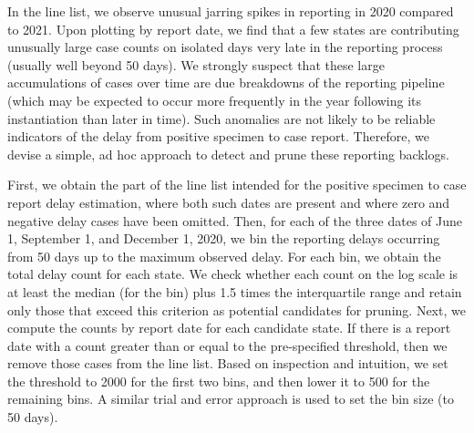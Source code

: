 \documentclass{article}
\begin{document}
In the line list, we observe unusual jarring spikes in reporting in 2020
compared to 2021. Upon plotting by report date, we find that a few states are
contributing unusually large case counts on isolated days very late in the
reporting process (usually well beyond 50 days). We strongly suspect that these
large accumulations of cases over time are due breakdowns of the reporting
pipeline (which may be expected to occur more frequently in the year following
its instantiation than later in time). Such anomalies are not likely to be
reliable indicators of the delay from positive specimen to case report.
Therefore, we devise a simple, ad hoc approach to detect and prune these
reporting backlogs.

First, we obtain the part of the line list intended for the positive specimen to
case report delay estimation, where both such dates are present and where zero
and negative delay cases have been omitted. Then, for each of the three dates of
June 1, September 1, and December 1, 2020, we bin the reporting delays occurring
from 50 days up to the maximum observed delay. For each bin, we obtain the total
delay count for each state. We check whether each count on the log scale is at
least the median (for the bin) plus 1.5 times the interquartile range and retain
only those that exceed this criterion as potential candidates for pruning. Next,
we compute the counts by report date for each candidate state. If there is a
report date with a count greater than or equal to the pre-specified threshold,
then we remove those cases from the line list. Based on inspection and
intuition, we set the threshold to 2000 for the first two bins, and then lower
it to 500 for the remaining bins. A similar trial and error approach is used to
set the bin size (to 50 days).
\end{document}
